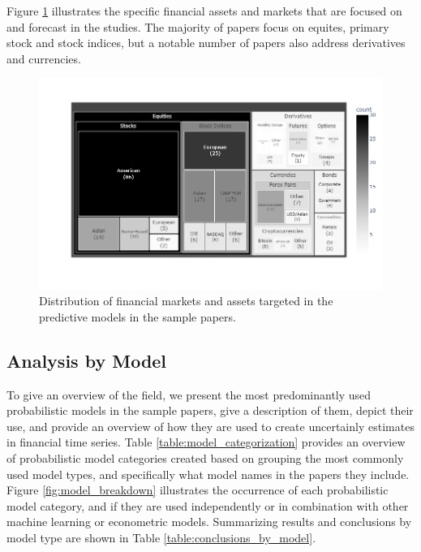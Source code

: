 Figure \ref{fig:treemap_asset_by_market} illustrates the specific financial assets and markets that are focused on and forecast in the studies. The majority of papers focus on equites, primary stock and stock indices, but a notable number of papers also address derivatives and currencies.  
\begin{figure}[H]
    \centering
    \includegraphics[width=1\linewidth]{Images/treemap_asset_by_market.png}
    \caption{Distribution of financial markets and assets targeted in the predictive models in the sample papers. }
    \label{fig:treemap_asset_by_market}
\end{figure}





\subsection{Analysis by Model}
To give an overview of the field, we present the most predominantly used probabilistic models in the sample papers, give a description of them, depict their use, and provide an overview of how they are used to create uncertainly estimates in financial time series. Table \ref{table:model_categorization} provides an overview of probabilistic model categories created based on grouping the most commonly used model types, and specifically what model names in the papers they include. Figure \ref{fig:model_breakdown} illustrates the occurrence of each probabilistic model category, and if they are used independently or in combination with other machine learning or econometric models. Summarizing results and conclusions by model type are shown in Table \ref{table:conclusions_by_model}.

